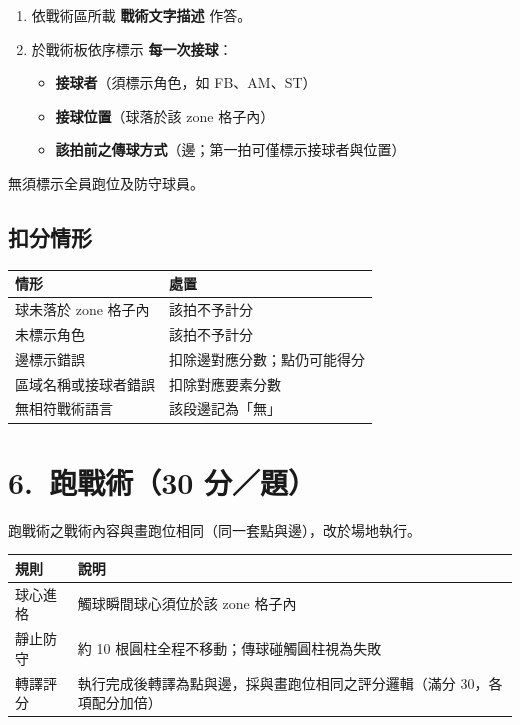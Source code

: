 \documentclass[11pt]{article}
\newcommand{\term}[1]{\textbf{#1}}
\begin{document}
\begin{enumerate}
  \item 依戰術區所載 \term{戰術文字描述} 作答。
  \item 於戰術板依序標示 \term{每一次接球}：
  \begin{itemize}
    \item \textbf{接球者}（須標示角色，如 FB、AM、ST）
    \item \textbf{接球位置}（球落於該 zone 格子內）
    \item \textbf{該拍前之傳球方式}（邊；第一拍可僅標示接球者與位置）
  \end{itemize}
\end{enumerate}

\noindent
無須標示全員跑位及防守球員。

\subsection*{扣分情形}

\vspace{0.3em}
\begin{tabular}{@{}ll@{}}
\toprule
\textbf{情形} & \textbf{處置} \\
\midrule
球未落於 zone 格子內 & 該拍不予計分 \\
未標示角色 & 該拍不予計分 \\
邊標示錯誤 & 扣除邊對應分數；點仍可能得分 \\
區域名稱或接球者錯誤 & 扣除對應要素分數 \\
無相符戰術語言 & 該段邊記為「無」 \\
\bottomrule
\end{tabular}

\section*{6.\ 跑戰術（30 分／題）}

跑戰術之戰術內容與畫跑位相同（同一套點與邊），改於場地執行。

\vspace{0.4em}
\begin{tabular}{@{}ll@{}}
\toprule
\textbf{規則} & \textbf{說明} \\
\midrule
球心進格 & 觸球瞬間球心須位於該 zone 格子內 \\
靜止防守 & 約 10 根圓柱全程不移動；傳球碰觸圓柱視為失敗 \\
轉譯評分 & 執行完成後轉譯為點與邊，採與畫跑位相同之評分邏輯（滿分 30，各項配分加倍） \\
\bottomrule
\end{tabular}
\end{document}
